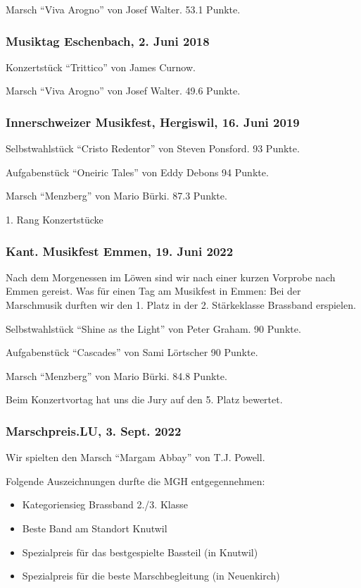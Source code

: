 \begin{history}
    Marsch \enquote{Viva Arogno} von Josef Walter. 53.1 Punkte.


    \subsubsection*{Musiktag Eschenbach, 2. Juni 2018}

    Konzertstück \enquote{Trittico} von James Curnow.

    Marsch \enquote{Viva Arogno} von Josef Walter. 49.6 Punkte.



    \subsubsection*{Innerschweizer Musikfest, Hergiswil, 16. Juni 2019}

    Selbstwahlstück   \enquote{Cristo Redentor} von Steven Ponsford. 93 Punkte.

    Aufgabenstück \enquote{Oneiric Tales} von Eddy Debons 94 Punkte.

    Marsch \enquote{Menzberg} von Mario Bürki. 87.3 Punkte.

    1. Rang Konzertstücke


    \subsubsection*{Kant. Musikfest Emmen, 19. Juni 2022}
    Nach dem Morgenessen im Löwen sind wir nach einer kurzen Vorprobe nach Emmen
    gereist. Was für einen Tag am Musikfest in Emmen: Bei der Marschmusik
    durften wir den 1. Platz in der 2. Stärkeklasse Brassband erspielen.

    Selbstwahlstück   \enquote{Shine as the Light} von Peter Graham. 90 Punkte.

    Aufgabenstück \enquote{Cascades} von Sami Lörtscher 90 Punkte.

    Marsch \enquote{Menzberg} von Mario Bürki. 84.8 Punkte.


    Beim Konzertvortag hat uns die Jury auf den 5. Platz bewertet.

    \subsubsection*{Marschpreis.LU, 3. Sept. 2022}
    Wir spielten den Marsch \enquote{Margam Abbay} von T.J. Powell.

    Folgende Auszeichnungen durfte die MGH entgegennehmen:
    \begin{itemize}
        \item Kategoriensieg Brassband 2./3. Klasse\\
        \item Beste Band am Standort Knutwil\\
        \item Spezialpreis für das bestgespielte Bassteil (in Knutwil)\\
        \item Spezialpreis für die beste Marschbegleitung (in Neuenkirch)\\
    \end{itemize}


\end{history}